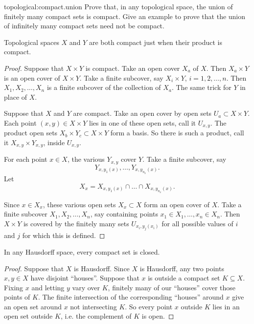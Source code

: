 \begin{problem}{topological:compact.union}
Prove that, in any topological space, the union of finitely many compact sets is compact.
Give an example to prove that the union of infinitely many compact sets need not be compact.
\end{problem}
\begin{lemma}
Topological spaces \(X\) and \(Y\) are both compact just when their product is compact.
\end{lemma}
\begin{proof}
Suppose that \(X \times Y\) is compact.
Take an open cover \(X_a\) of \(X\).
Then \(X_a \times Y\) is an open cover of \(X \times Y\).
Take a finite subcover, say \(X_i \times Y\), \(i=1,2,\dots,n\).
Then \(X_1, X_2, \dots, X_n\) is a finite subcover of the collection of \(X_a\).
The same trick for \(Y\) in place of \(X\).

Suppose that \(X\) and \(Y\) are compact.
Take an open cover by open sets \(U_a \subset X \times Y\).
Each point \((x,y) \in X \times Y\) lies in one of these open sets, call it \(U_{x,y}\).
The product open sets \(X_b \times Y_c \subset X \times Y\) form a basis.
So there is such a product, call it \(X_{x,y} \times Y_{x,y}\), inside \(U_{x,y}\).

For each point \(x \in X\), the various \(Y_{x,y}\) cover \(Y\).
Take a finite subcover, say 
\[
Y_{x,y_1(x)}, \dots, Y_{x,y_{n_x}(x)}.
\]
Let
\[
X_x = X_{x,y_1(x)} \cap \dots \cap X_{x,y_{n_x}(x)}.
\]

Since \(x \in X_x\), these various open sets \(X_x \subset X\) form an open cover of \(X\).
Take a finite subcover \(X_1, X_2, \dots, X_n\), say containing points \(x_1 \in X_1, \dots, x_n \in X_n\).
Then \(X \times Y\) is covered by the finitely many sets
\(
U_{x_i,y_j(x_i)}
\)
for all possible values of \(i\) and \(j\) for which this is defined.
\end{proof}
\begin{lemma}\label{lemma:compact.closed}
In any Hausdorff space, every compact set is closed.
\end{lemma}
\begin{proof}
Suppose that \(X\) is Hausdorff.
Since \(X\) is Hausdorff, any two points \(x,y \in X\) have disjoint ``houses''.
Suppose that \(x\) is outside a compact set \(K \subseteq X\).
Fixing \(x\) and letting \(y\) vary over \(K\), finitely many of our ``houses'' cover those points of \(K\).
The finite intersection of the corresponding ``houses'' around \(x\) give an open set around \(x\) not intersecting \(K\).
So every point \(x\) outside \(K\) lies in an open set outside \(K\), i.e. the complement of \(K\) is open.
\end{proof}
